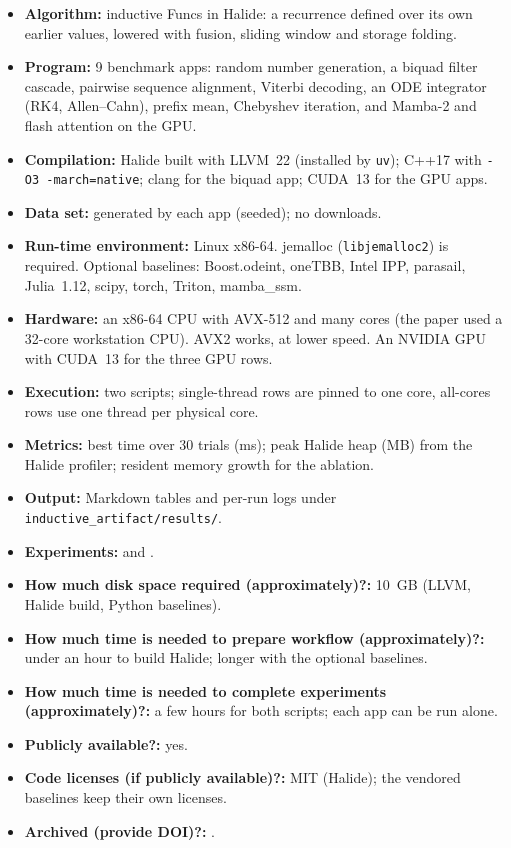 {\small
\begin{itemize}
  \item {\bf Algorithm:} inductive Funcs in Halide: a recurrence defined over
    its own earlier values, lowered with fusion, sliding window and storage
    folding.
  \item {\bf Program:} 9 benchmark apps: random number generation, a biquad
    filter cascade, pairwise sequence alignment, Viterbi decoding, an ODE
    integrator (RK4, Allen--Cahn), prefix mean, Chebyshev iteration, and
    Mamba-2 and flash attention on the GPU.
  \item {\bf Compilation:} Halide built with LLVM~22 (installed by
    \texttt{uv}); C++17 with \texttt{-O3 -march=native}; clang for the biquad
    app; CUDA~13 for the GPU apps.
  \item {\bf Data set:} generated by each app (seeded); no downloads.
  \item {\bf Run-time environment:} Linux x86-64. jemalloc (\texttt{libjemalloc2})
    is required. Optional baselines: Boost.odeint, oneTBB, Intel IPP,
    parasail, Julia~1.12, scipy, torch, Triton, mamba\_ssm.
  \item {\bf Hardware:} an x86-64 CPU with AVX-512 and many cores (the paper
    used a 32-core workstation CPU). AVX2 works, at lower speed. An NVIDIA
    GPU with CUDA~13 for the three GPU rows.
  \item {\bf Execution:} two scripts; single-thread rows are pinned to one
    core, all-cores rows use one thread per physical core.
  \item {\bf Metrics:} best time over 30 trials (ms); peak Halide heap (MB)
    from the Halide profiler; resident memory growth for the ablation.
  \item {\bf Output:} Markdown tables and per-run logs under
    \texttt{inductive\_artifact/results/}.
  \item {\bf Experiments:} \papertable{} and \paperablation{}.
  \item {\bf How much disk space required (approximately)?:} 10~GB (LLVM,
    Halide build, Python baselines).
  \item {\bf How much time is needed to prepare workflow (approximately)?:}
    under an hour to build Halide; longer with the optional baselines.
  \item {\bf How much time is needed to complete experiments (approximately)?:}
    a few hours for both scripts; each app can be run alone.
  \item {\bf Publicly available?:} yes.
  \item {\bf Code licenses (if publicly available)?:} MIT (Halide); the
    vendored baselines keep their own licenses.
  \item {\bf Archived (provide DOI)?:} \artifactdoi.
\end{itemize}
}

